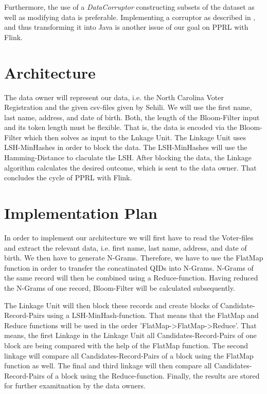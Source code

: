\documentclass[10pt]{article}
\begin{document}
            Furthermore, the use of a \textit{DataCorruptor} constructing subsets of the dataset as well as
            modifying data is preferable. Implementing a corruptor as described in \cite{DataCorruptor}, and thus transforming
            it into Java is another issue of our goal on PPRL with Flink.


    \section{Architecture}


        The data owner will represent our data, i.e. the North Carolina Voter Registration and the
        given csv-files given by Sehili. We will use the first name, last name, address, and date of birth.
        Both, the length of the Bloom-Filter input and its token length must be flexible. That is, the data is encoded
        via the Bloom-Filter which then solves as input to the Lnkage Unit.
        The Linkage Unit uses LSH-MinHashes in order to block the data. The LSH-MinHashes will use the Hamming-Distance
        to claculate the LSH. After blocking the data, the Linkage algorithm calculates the desired outcome,
        which is sent to the data owner. That concludes the cycle of PPRL with Flink.

    \section{Implementation Plan}


        In order to implement our architecture we will first have to read the Voter-files and
        extract the relevant data, i.e. first name, last name, address, and date of birth.
        We then have to generate N-Grams. Therefore, we have to use the FlatMap function
        in order to transfer the concatinated QIDs into N-Grams. N-Grams of the same record will then be
        combined using a Reduce-function.
        Having reduced the N-Grams of one record, Bloom-Filter will be calculated subsequently.

        The Linkage Unit will then block these records and create blocks of Candidate-Record-Pairs
        using a LSH-MinHash-function. That means that the FlatMap and Reduce functions will be used in
        the order 'FlatMap->FlatMap->Reduce'.
        That means, the first Linkage in the Linkage Unit all Candidates-Record-Pairs of one block are
        being compared with the help of the FlatMap function.
        The second linkage will compare all Candidates-Record-Pairs of a block using the
        FlatMap function as well. The final and third linkage will then compare all
        Candidates-Record-Pairs of a block using the Reduce-function.
        Finally, the results are stored for further examitnation by the data owners.



        
        
\end{document}
